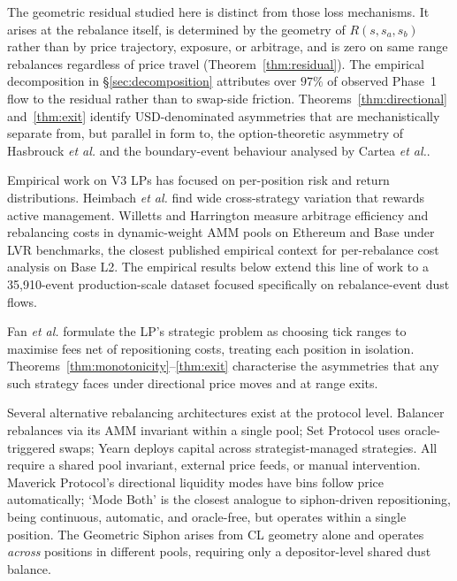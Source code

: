 \documentclass[11pt,a4paper]{article}
\theoremstyle{plain}
\begin{document}
The geometric residual studied here is distinct from those loss mechanisms. It arises at the rebalance itself, is determined by the geometry of $R(s, s_a, s_b)$ rather than by price trajectory, exposure, or arbitrage, and is zero on same range rebalances regardless of price travel (Theorem~\ref{thm:residual}). The empirical decomposition in \S\ref{sec:decomposition} attributes over $97\%$ of observed Phase~1 flow to the residual rather than to swap-side friction. Theorems~\ref{thm:directional} and~\ref{thm:exit} identify USD-denominated asymmetries that are mechanistically separate from, but parallel in form to, the option-theoretic asymmetry of Hasbrouck \emph{et al.}\cite{hasbrouck2025} and the boundary-event behaviour analysed by Cartea \emph{et al.}\cite{cartea2024}.

Empirical work on V3 LPs has focused on per-position risk and return distributions. Heimbach \emph{et al.}\cite{heimbach2022} find wide cross-strategy variation that rewards active management. Willetts and Harrington\cite{willetts2026} measure arbitrage efficiency and rebalancing costs in dynamic-weight AMM pools on Ethereum and Base under LVR benchmarks, the closest published empirical context for per-rebalance cost analysis on Base L2. The empirical results below extend this line of work to a 35{,}910-event production-scale dataset focused specifically on rebalance-event dust flows.

Fan \emph{et al.}\cite{fan2023} formulate the LP's strategic problem as choosing tick ranges to maximise fees net of repositioning costs, treating each position in isolation. Theorems~\ref{thm:monotonicity}--\ref{thm:exit} characterise the asymmetries that any such strategy faces under directional price moves and at range exits.

Several alternative rebalancing architectures exist at the protocol level. Balancer\cite{martinelli2019} rebalances via its AMM invariant within a single pool; Set Protocol uses oracle-triggered swaps; Yearn deploys capital across strategist-managed strategies. All require a shared pool invariant, external price feeds, or manual intervention. Maverick Protocol's directional liquidity modes\cite{maverick2023} have bins follow price automatically; `Mode Both' is the closest analogue to siphon-driven repositioning, being continuous, automatic, and oracle-free, but operates within a single position. The Geometric Siphon arises from CL geometry alone and operates \emph{across} positions in different pools, requiring only a depositor-level shared dust balance.
\end{document}
